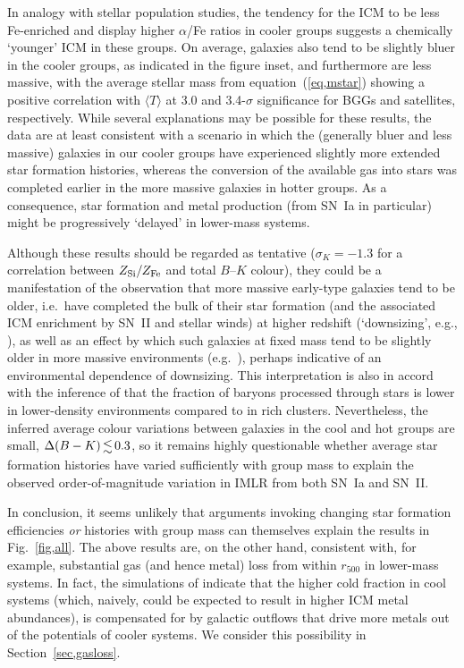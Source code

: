 \documentclass[useAMS,usenatbib]{mn2e}
\begin{document}
In analogy with stellar population studies, the tendency for the ICM
to be less Fe-enriched and display higher $\alpha$/Fe ratios in cooler
groups suggests a chemically `younger' ICM in these groups. On
average, galaxies also tend to be slightly bluer in the cooler groups,
as indicated in the figure inset, and furthermore are less massive,
with the average stellar mass from equation~(\ref{eq,mstar}) showing a
positive correlation with $\langle T\rangle$ at 3.0 and 3.4-$\sigma$
significance for BGGs and satellites, respectively. While several
explanations may be possible for these results, the data are at least
consistent with a scenario in which the (generally bluer and less
massive) galaxies in our cooler groups have experienced slightly more
extended star formation histories, whereas the conversion of the
available gas into stars was completed earlier in the more massive
galaxies in hotter groups. As a consequence, star formation and metal
production (from SN~Ia in particular) might be progressively `delayed'
in lower-mass systems.

Although these results should be regarded as tentative ($\sigma_K =
-1.3$ for a correlation between $Z_{\rm Si}/Z_{\rm Fe}$ and total
$B$--$K$ colour), they could be a manifestation of the observation
that more massive early-type galaxies tend to be older, i.e.\ have
completed the bulk of their star formation (and the associated ICM
enrichment by SN~II and stellar winds) at higher redshift
(`downsizing', e.g., \citealt{catt08}), as well as an effect by which
such galaxies at fixed mass tend to be slightly older in more massive
environments (e.g.\ \citealt{sanc06}), perhaps indicative of an
environmental dependence of downsizing. This interpretation is also in
accord with the inference of \citet{loew06} that the fraction of
baryons processed through stars is lower in lower-density environments
compared to in rich clusters. Nevertheless, the inferred average
colour variations between galaxies in the cool and hot groups are
small, $\Delta(B-K) \la 0.3$, so it remains highly questionable
whether average star formation histories have varied sufficiently with
group mass to explain the observed order-of-magnitude variation in
IMLR from both SN~Ia and SN~II.

In conclusion, it seems unlikely that arguments invoking changing star
formation efficiencies {\em or} histories with group mass can
themselves explain the results in Fig.~\ref{fig,all}.  The above
results are, on the other hand, consistent with, for example,
substantial gas (and hence metal) loss from within $r_{500}$ in
lower-mass systems. In fact, the simulations of \citet{dave08}
indicate that the higher cold fraction in cool systems (which,
naively, could be expected to result in higher ICM metal abundances),
is compensated for by galactic outflows that drive more metals out of
the potentials of cooler systems. We consider this possibility in
Section~\ref{sec,gasloss}.
\end{document}
